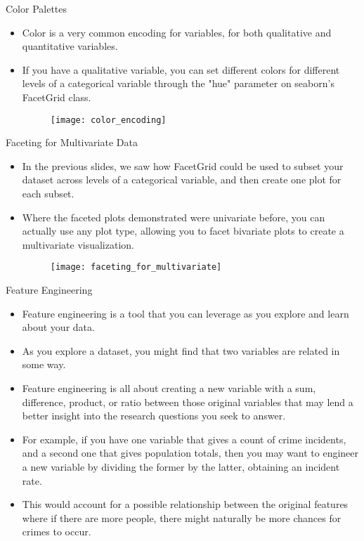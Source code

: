 \documentclass[12pt]{beamer}
\begin{document}
    \begin{frame}{Color Palettes}
    	\begin{itemize}
    		\item Color is a very common encoding for variables, for both qualitative and quantitative variables.
    		\item If you have a qualitative variable, you can set different colors for different levels of a categorical variable through the "hue" parameter on seaborn's FacetGrid class.
    		
    		\begin{figure}
    			\centering
    			\texttt{[image: color\_encoding]}
    		\end{figure}
    	\end{itemize}
    \end{frame}
    \begin{frame}{Faceting for Multivariate Data}
    	\begin{itemize}
    		\item In the previous slides, we saw how FacetGrid could be used to subset your dataset across levels of a categorical variable, and then create one plot for each subset.
    		\item Where the faceted plots demonstrated were univariate before, you can actually use any plot type, allowing you to facet bivariate plots to create a multivariate visualization.
    		\begin{figure}
    			\centering
    			\texttt{[image: faceting\_for\_multivariate]}
    		\end{figure}
    	\end{itemize}
    \end{frame}
    \begin{frame}{Feature Engineering}
    	\begin{itemize}
    		\item Feature engineering is a tool that you can leverage as you explore and learn about your data.
    		\item As you explore a dataset, you might find that two variables are related in some way.
    		\item Feature engineering is all about creating a new variable with a sum, difference, product, or ratio between those original variables that may lend a better insight into the research questions you seek to answer.
    		\item For example, if you have one variable that gives a count of crime incidents, and a second one that gives population totals, then you may want to engineer a new variable by dividing the former by the latter, obtaining an incident rate.
    		\item This would account for a possible relationship between the original features where if there are more people, there might naturally be more chances for crimes to occur.
    	\end{itemize}
    \end{frame}
\end{document}

